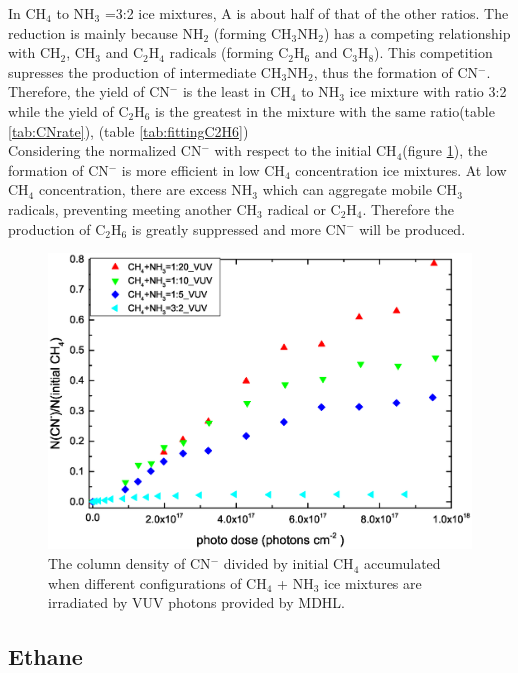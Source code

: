 In CH$_4$ to NH$_3$ =3:2 ice mixtures, A is about half of that of the other ratios. The reduction is mainly because NH$_2$ (forming CH$_3$NH$_2$) has a competing relationship with CH$_2$, CH$_3$ and C$_2$H$_4$ radicals (forming C$_2$H$_6$ and C$_3$H$_8$). This competition supresses the production of intermediate CH$_3$NH$_2$, thus the formation of CN$^-$. Therefore, the yield of CN$^-$ is the least in CH$_4$ to NH$_3$ ice mixture with ratio 3:2 while the yield of C$_2$H$_6$ is the greatest in the mixture with the same ratio(table \ref{tab:CNrate}), (table \ref{tab:fittingC2H6})\\

Considering the normalized CN$^-$ with respect to the initial CH$_4$(figure \ref{fig:CN_CH4}), the formation of CN$^-$ is more efficient in low CH$_4$ concentration ice mixtures. At low CH$_4$ concentration, there are excess NH$_3$ which can aggregate mobile CH$_3$ radicals, preventing meeting another CH$_3$ radical or C$_2$H$_4$. Therefore the production of C$_2$H$_6$ is greatly suppressed and more CN$^-$ will be produced.

\begin{figure}
\centering
\includegraphics[width=\textwidth]{figures/chapter3/CN_CH4.eps}
\caption{The column density of CN$^-$ divided by initial CH$_4$ accumulated when different configurations of CH$_4$ + NH$_3$ ice mixtures are irradiated by VUV photons provided by MDHL.}
\label{fig:CN_CH4}
\end{figure}

\subsection{Ethane}


